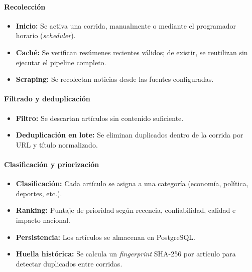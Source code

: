 \documentclass[12pt,oneside]{report}
\begin{document}
\paragraph{Recolecci\'on}
\begin{itemize}[nosep]
    \item \textbf{Inicio:} Se activa una corrida, manualmente o mediante el programador horario (\textit{scheduler}).
    \item \textbf{Cach\'e:} Se verifican res\'umenes recientes v\'alidos; de existir, se reutilizan sin ejecutar el pipeline completo.
    \item \textbf{Scraping:} Se recolectan noticias desde las fuentes configuradas.
\end{itemize}

\paragraph{Filtrado y deduplicaci\'on}
\begin{itemize}[nosep]
    \item \textbf{Filtro:} Se descartan art\'iculos sin contenido suficiente.
    \item \textbf{Deduplicaci\'on en lote:} Se eliminan duplicados dentro de la corrida por URL y t\'itulo normalizado.
\end{itemize}

\paragraph{Clasificaci\'on y priorizaci\'on}
\begin{itemize}[nosep]
    \item \textbf{Clasificaci\'on:} Cada art\'iculo se asigna a una categor\'ia (econom\'ia, pol\'itica, deportes, etc.).
    \item \textbf{Ranking:} Puntaje de prioridad seg\'un recencia, confiabilidad, calidad e impacto nacional.
    \item \textbf{Persistencia:} Los art\'iculos se almacenan en PostgreSQL.
    \item \textbf{Huella hist\'orica:} Se calcula un \textit{fingerprint} SHA-256 por art\'iculo para detectar duplicados entre corridas.
\end{itemize}
\end{document}
